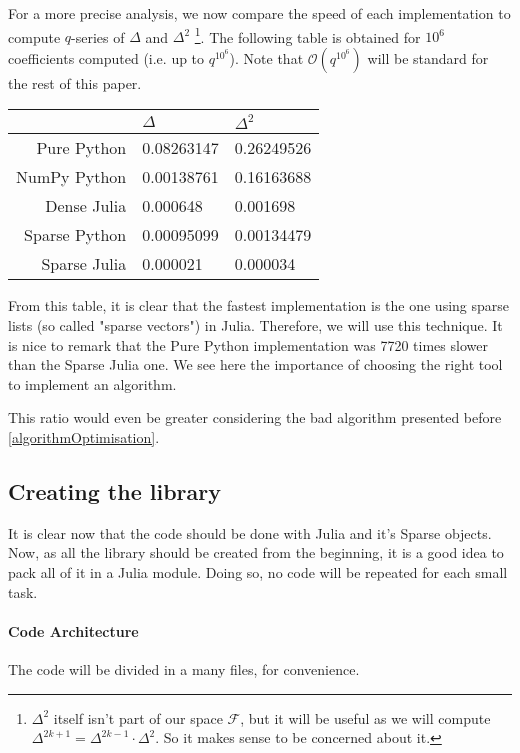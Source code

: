 For a more precise analysis, we now compare the speed of each implementation to compute $q$-series of $\Delta$ and $\Delta^2$
\footnote{$\Delta^2$ itself isn't part of our space $\mathcal{F}$, but it will be useful as we will compute $\Delta^{2k+1} = \Delta^{2k-1}\cdot \Delta^2$. So it makes sense to be concerned about it.}.
The following table is obtained for $10^6$ coefficients computed (i.e. up to $q^{10^6}$).
Note that $\mathcal{O}(q^{10^6})$ will be standard for the rest of this paper.

\begin{center}
	\begin{tabular}{r||l|l}
		 & $\Delta$ & $\Delta^2$\\
		\hline\hline
		Pure Python   & 0.08263147 & 0.26249526 \\
		NumPy Python  & 0.00138761 & 0.16163688 \\
		Dense Julia   & 0.000648   & 0.001698   \\
		Sparse Python & 0.00095099 & 0.00134479 \\
		Sparse Julia  & 0.000021   & 0.000034   \\
	\end{tabular}
\end{center}

From this table, it is clear that the fastest implementation is the one using sparse lists (so called "sparse vectors") in Julia.
Therefore, we will use this technique.
It is nice to remark that the Pure Python implementation was 7720 times slower than the Sparse Julia one.
We see here the importance of choosing the right tool to implement an algorithm.

This ratio would even be greater considering the bad algorithm presented before \ref{algorithmOptimisation}.



\subsection{Creating the library}
It is clear now that the code should be done with Julia and it's Sparse objects.
Now, as all the library should be created from the beginning, it is a good idea to pack all of it in a Julia module.
Doing so, no code will be repeated for each small task.
\paragraph{Code Architecture}
The code will be divided in a many files, for convenience.


